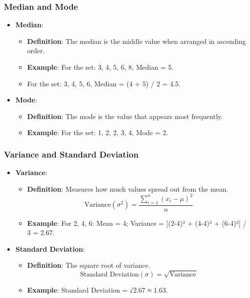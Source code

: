 \documentclass[aspectratio=169]{beamer}
\begin{document}
\begin{frame}[fragile]
    \frametitle{Median and Mode}
    \begin{itemize}
        \item \textbf{Median}:
        \begin{itemize}
            \item \textbf{Definition}: The median is the middle value when arranged in ascending order.
            \item \textbf{Example}: For the set: 3, 4, 5, 6, 8, Median = 5.
            \item For the set: 3, 4, 5, 6, Median = (4 + 5) / 2 = 4.5.
        \end{itemize}
        
        \item \textbf{Mode}:
        \begin{itemize}
            \item \textbf{Definition}: The mode is the value that appears most frequently.
            \item \textbf{Example}: For the set: 1, 2, 2, 3, 4, Mode = 2.
        \end{itemize}
    \end{itemize}
\end{frame}

\begin{frame}[fragile]
    \frametitle{Variance and Standard Deviation}
    \begin{itemize}
        \item \textbf{Variance}:
        \begin{itemize}
            \item \textbf{Definition}: Measures how much values spread out from the mean.
            \begin{equation}
                \text{Variance} (\sigma^2) = \frac{\sum_{i=1}^{n} (x_i - \mu)^2}{n}
            \end{equation}
            \item \textbf{Example}: For 2, 4, 6: Mean = 4; Variance = [(2-4)² + (4-4)² + (6-4)²] / 3 = 2.67.
        \end{itemize}

        \item \textbf{Standard Deviation}:
        \begin{itemize}
            \item \textbf{Definition}: The square root of variance.
            \begin{equation}
                \text{Standard Deviation} (\sigma) = \sqrt{\text{Variance}}
            \end{equation}
            \item \textbf{Example}: Standard Deviation = √2.67 ≈ 1.63.
        \end{itemize}
    \end{itemize}
\end{frame}
\end{document}
